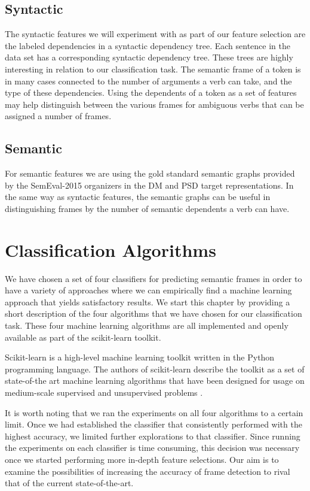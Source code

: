 \subsection{Syntactic}

The syntactic features we will experiment with as part of our feature selection are the labeled dependencies in a syntactic dependency tree. Each sentence in the data set has a corresponding syntactic dependency tree. These trees are highly interesting in relation to our classification task. The semantic frame of a token is in many cases connected to the number of arguments a verb can take, and the type of these dependencies. Using the dependents of a token as a set of features may help distinguish between the various frames for ambiguous verbs that can be assigned a number of frames. 

\subsection{Semantic}

For semantic features we are using the gold standard semantic graphs provided by the SemEval-2015 organizers in the DM and PSD target representations. In the same way as syntactic features, the semantic graphs can be useful in distinguishing frames by the number of semantic dependents a verb can have.

 
\section{Classification Algorithms}

We have chosen a set of four classifiers for predicting semantic frames in order to have a variety of approaches where we can empirically find a machine learning approach that yields satisfactory results. We start this chapter by providing a short description of the four algorithms that we have chosen for our classification task. These four machine learning algorithms are all implemented and openly available as part of the scikit-learn toolkit.

Scikit-learn is a high-level machine learning toolkit written in the Python programming language. The authors of scikit-learn describe the toolkit as a set of state-of-the art machine learning algorithms that have been designed for usage on medium-scale supervised and unsupervised problems \cite{scikit-learn}.

It is worth noting that we ran the experiments on all four algorithms to a certain limit. Once we had established the classifier that consistently performed with the highest accuracy, we limited further explorations to that classifier. Since running the experiments on each classifier is time consuming, this decision was necessary once we started performing more in-depth feature selections. Our aim is to examine the possibilities of increasing the accuracy of frame detection to rival that of the current state-of-the-art.

